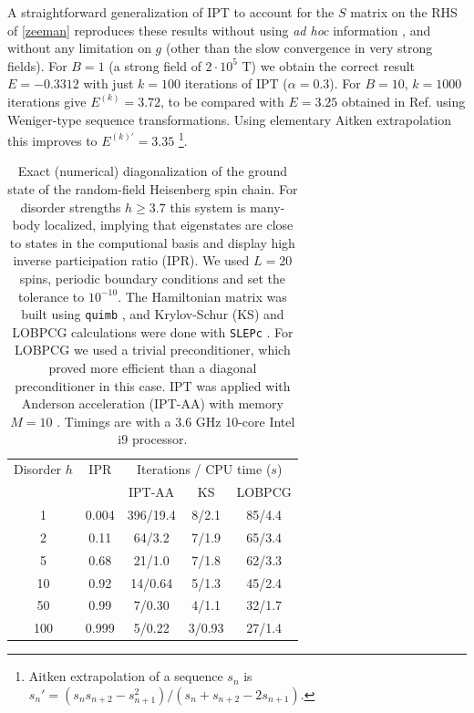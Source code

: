 \documentclass[aps,prl,reprint]{revtex4-2}
\begin{document}
	 A straightforward generalization of IPT to account for the $S$ matrix on the RHS of \eqref{zeeman} reproduces these results without using \emph{ad hoc} information , and without any limitation on $g$ (other than the slow convergence in very strong fields). For $B=1$ (a strong field of $2\cdot 10^5$ T) we obtain the correct result $E = -0.3312$ with just $k=100$ iterations of $\textrm{IPT}$ ($\alpha = 0.3$). For $B=10$, $k=1000$ iterations give $E^{(k)} = 3.72$, to be compared with $E = 3.25$ obtained in Ref. \cite{cizekNewSummationTechnique2003} using Weniger-type sequence transformations. Using elementary Aitken extrapolation this improves to $E^{(k)'} = 3.35$ \footnote{Aitken extrapolation of a sequence $s_n$ is $s_n'=(s_n s_{n+2}-s_{n+1}^2)/(s_n +s_{n+2}-2s_{n+1})$.}.

\begin{table}[t]

 \begin{tabular}{| c |  c || c  c  c |}
  \hline
  Disorder $h$ & IPR & \multicolumn{3}{c|}{Iterations / CPU time ($s$)} \\

 &  & IPT-AA & KS & LOBPCG \\
 \hline\hline
 1 & 0.004 & 396/19.4 & 8/2.1 & 85/4.4 \\
  \hline
 2 & 0.11 & 64/3.2 & 7/1.9 & 65/3.4  \\
  \hline
 5 & 0.68 & 21/1.0 & 7/1.8 & 62/3.3  \\
 \hline
 10 & 0.92 & 14/0.64 & 5/1.3 & 45/2.4  \\
 \hline
 50 & 0.99 & 7/0.30 & 4/1.1 & 32/1.7  \\
 \hline
  100 & 0.999 & 5/0.22 & 3/0.93 & 27/1.4  \\
  \hline
\end{tabular}
    \caption{Exact (numerical) diagonalization of the ground state of the random-field Heisenberg spin chain. For disorder strengths $h\geq 3.7$ this system is many-body localized, implying that eigenstates are close to states in the computional basis \cite{serbyn2013local} and display high inverse participation ratio (IPR). We used $L=20$ spins, periodic boundary conditions and set the tolerance to $10^{-10}$. The Hamiltonian matrix was built using \texttt{quimb} \cite{gray2018quimb}, and Krylov-Schur (KS) and LOBPCG calculations were done with \texttt{SLEPc} \cite{hernandez2005slepc}. For LOBPCG we used a trivial preconditioner, which proved more efficient than a diagonal preconditioner in this case. IPT was applied with Anderson acceleration (IPT-AA) with memory $M=10$ \cite{zhang2020globally}. Timings are with a $3.6$ GHz 10-core Intel i9 processor.}
    \label{table}
\end{table}
\end{document}
